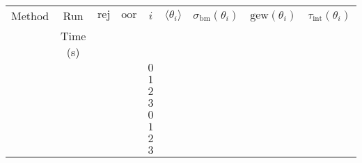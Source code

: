 \begin{table}[h!]
\begin{center}
\begin{tabular}{|c|c|c|c|c|c|c|c|c|}
\hline
Method & Run      & $\text{rej}$           & $\text{oor}$           & $i$ & $\langle\theta_i\rangle$ & $\sigma_{\text{bm}}(\theta_i)$ & $\text{gew}(\theta_i)$ & $\tau_{\text{int}}(\theta_i)$ \\
       & Time (s) &                        &                        &     &                          &                                &                        &                               \\
\hline
\hline
       &          &                        &                        & $0$ &                          &                                &                        &                               \\
\cline{5-9}
       &          &                        &                        & $1$ &                          &                                &                        &                               \\
\cline{5-9}
       &          &                        &                        & $2$ &                          &                                &                        &                               \\
\cline{5-9}
       &          &                        &                        & $3$ &                          &                                &                        &                               \\
\hline
\hline
       &          &                        &                        & $0$ &                          &                                &                        &                               \\
\cline{5-9}
       &          &                        &                        & $1$ &                          &                                &                        &                               \\
\cline{5-9}
       &          &                        &                        & $2$ &                          &                                &                        &                               \\
\cline{5-9}
       &          &                        &                        & $3$ &                          &                                &                        &                               \\

\end{tabular}
\end{center}
\end{table}
